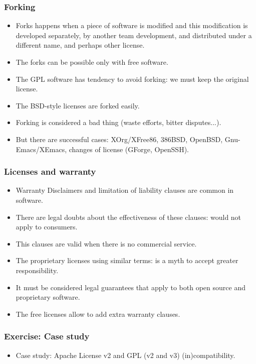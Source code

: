 \begin{frame}
\frametitle{Forking}

\begin{itemize}
\item Forks happens when a piece of software is modified and this modification is developed separately, by another team development, and distributed under a different name, and perhaps other
license.
\item The forks can be possible only with free software.
\item The GPL software has tendency to avoid forking: we must keep the original license.
\item The BSD-style licenses are forked easily.
\item Forking is considered a bad thing (waste efforts, bitter disputes...).
\item But there are successful cases: XOrg/XFree86, 386BSD, OpenBSD, Gnu-Emacs/XEmacs, changes of license (GForge, OpenSSH).
\end{itemize}


\end{frame}



\begin{frame}
\frametitle{Licenses and warranty}

\begin{itemize}
\item Warranty Disclaimers and limitation of liability clauses are common in software.
\item There are legal doubts about the effectiveness of these clauses: would not apply to consumers.
\item This clauses are valid when there is no commercial service.
\item The proprietary licenses using similar terms: is a myth to accept greater responsibility.
\item It must be considered legal guarantees that apply to both open source and proprietary software.
\item The free licenses allow to add extra warranty clauses.

\end{itemize}


\end{frame}


\begin{frame}
\frametitle{Exercise: Case study}


\begin{itemize}
\item Case study: Apache License v2 and GPL (v2 and v3)  (in)compatibility.
\end{itemize}

\end{frame}


